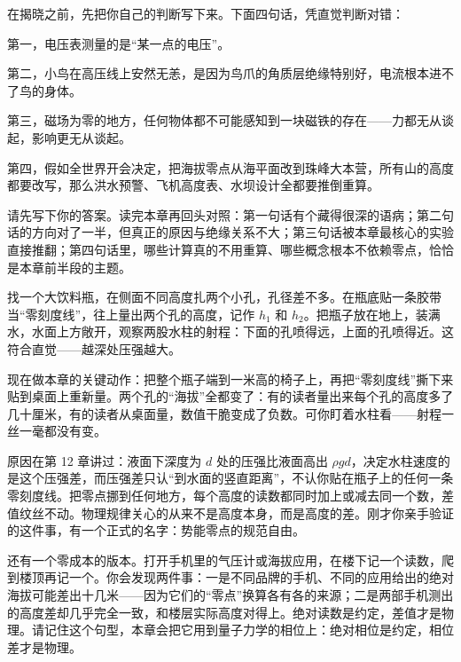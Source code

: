 \begin{mainline}
在揭晓之前，先把你自己的判断写下来。下面四句话，凭直觉判断对错：

第一，电压表测量的是“某一点的电压”。

第二，小鸟在高压线上安然无恙，是因为鸟爪的角质层绝缘特别好，电流根本进不了鸟的身体。

第三，磁场为零的地方，任何物体都不可能感知到一块磁铁的存在——力都无从谈起，影响更无从谈起。

第四，假如全世界开会决定，把海拔零点从海平面改到珠峰大本营，所有山的高度都要改写，那么洪水预警、飞机高度表、水坝设计全都要推倒重算。

请先写下你的答案。读完本章再回头对照：第一句话有个藏得很深的语病；第二句话的方向对了一半，但真正的原因与绝缘关系不大；第三句话被本章最核心的实验直接推翻；第四句话里，哪些计算真的不用重算、哪些概念根本不依赖零点，恰恰是本章前半段的主题。
\end{mainline}


\begin{experiment}
找一个大饮料瓶，在侧面不同高度扎两个小孔，孔径差不多。在瓶底贴一条胶带当“零刻度线”，往上量出两个孔的高度，记作 \(h_1\) 和 \(h_2\)。把瓶子放在地上，装满水，水面上方敞开，观察两股水柱的射程：下面的孔喷得远，上面的孔喷得近。这符合直觉——越深处压强越大。

现在做本章的关键动作：把整个瓶子端到一米高的椅子上，再把“零刻度线”撕下来贴到桌面上重新量。两个孔的“海拔”全都变了：有的读者量出来每个孔的高度多了几十厘米，有的读者从桌面量，数值干脆变成了负数。可你盯着水柱看——射程一丝一毫都没有变。

原因在第 12 章讲过：液面下深度为 \(d\) 处的压强比液面高出 \(\rho g d\)，决定水柱速度的是这个压强差，而压强差只认“到水面的竖直距离”，不认你贴在瓶子上的任何一条零刻度线。把零点挪到任何地方，每个高度的读数都同时加上或减去同一个数，差值纹丝不动。物理规律关心的从来不是高度本身，而是高度的差。刚才你亲手验证的这件事，有一个正式的名字：势能零点的规范自由。
\end{experiment}

\begin{mainline}
还有一个零成本的版本。打开手机里的气压计或海拔应用，在楼下记一个读数，爬到楼顶再记一个。你会发现两件事：一是不同品牌的手机、不同的应用给出的绝对海拔可能差出十几米——因为它们的“零点”换算各有各的来源；二是两部手机测出的高度差却几乎完全一致，和楼层实际高度对得上。绝对读数是约定，差值才是物理。请记住这个句型，本章会把它用到量子力学的相位上：绝对相位是约定，相位差才是物理。
\end{mainline}


